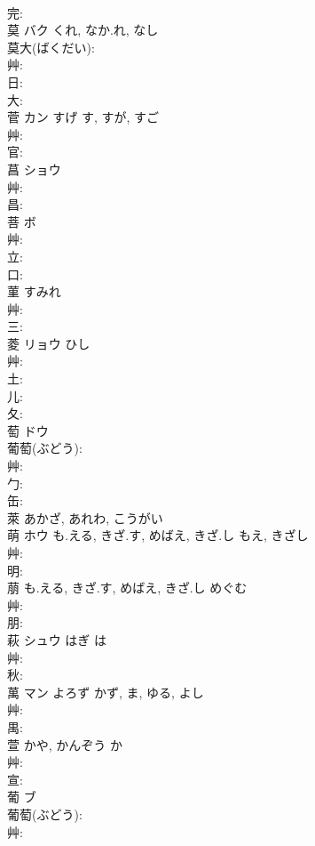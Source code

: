 \documentclass[8pt]{extreport}
\begin{document}
\begin{CJK}{UTF8}{min}
\\	完: 
\\	莫	バク	くれ, なか.れ, なし		
\\	莫大(ばくだい): 
\\	艸: 
\\	日: 
\\	大: 
\\	菅	カン	すげ	す, すが, すご	
\\	艸: 
\\	官: 
\\	菖	ショウ			
\\	艸: 
\\	昌: 
\\	菩	ボ			
\\	艸: 
\\	立: 
\\	口: 
\\	菫		すみれ			
\\	艸: 
\\	三: 
\\	菱	リョウ	ひし		
\\	艸: 
\\	土: 
\\	儿: 
\\	夂: 
\\	萄	ドウ			
\\	葡萄(ぶどう): 
\\	艸: 
\\	勹: 
\\	缶: 
\\	萊		あかざ, あれわ, こうがい				
\\	萌	ホウ	も.える, きざ.す, めばえ, きざ.し	もえ, きざし	
\\	艸: 
\\	明: 
\\	萠		も.える, きざ.す, めばえ, きざ.し	めぐむ			
\\	艸: 
\\	朋: 
\\	萩	シュウ	はぎ	は	
\\	艸: 
\\	秋: 
\\	萬	マン	よろず	かず, ま, ゆる, よし	
\\	艸: 
\\	禺: 
\\	萱		かや, かんぞう	か			
\\	艸: 
\\	宣: 
\\	葡	ブ			
\\	葡萄(ぶどう): 
\\	艸: 

\end{CJK}
\end{document}
